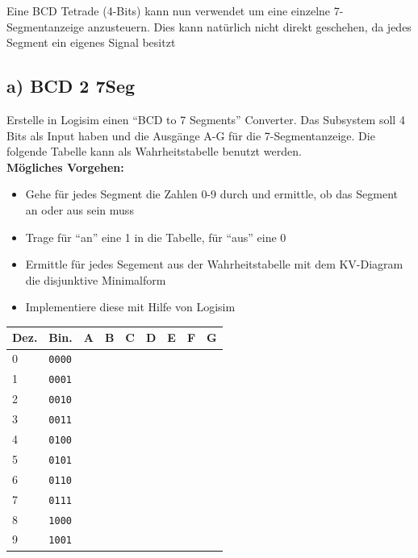 \documentclass[a4paper]{scrartcl}
\begin{document}
Eine BCD Tetrade (4-Bits) kann nun verwendet um eine einzelne 7-Segmentanzeige anzusteuern. Dies kann natürlich nicht direkt geschehen, 
da jedes Segment ein eigenes Signal besitzt

\subsection*{a) BCD 2 7Seg}
Erstelle in Logisim einen ``BCD to 7 Segments'' Converter. Das Subsystem soll 4 Bits als Input haben und die Ausgänge A-G für die 7-Segmentanzeige.
Die folgende Tabelle kann als Wahrheitstabelle benutzt werden.\\


\textbf{Mögliches Vorgehen:}
\begin{itemize}
  \item Gehe für jedes Segment die Zahlen 0-9 durch und ermittle, ob das Segment an oder aus sein muss
  \item Trage für ``an'' eine 1 in die Tabelle, für ``aus'' eine 0
  \item Ermittle für jedes Segement aus der Wahrheitstabelle mit dem KV-Diagram die disjunktive Minimalform
  \item Implementiere diese mit Hilfe von Logisim
\end{itemize}

\begin{table}[h]
  \centering
  \begin{tabular}{l|l|l|l|l|l|l|l|l}
    Dez. & Bin. & A & B & C & D & E & F & G \\ \hline
    0 & \texttt{0000}&&&&&&&\\ 
    1 & \texttt{0001}&&&&&&&\\ 
    2 & \texttt{0010}&&&&&&&\\ 
    3 & \texttt{0011}&&&&&&&\\ 
    4 & \texttt{0100}&&&&&&&\\ 
    5 & \texttt{0101}&&&&&&&\\ 
    6 & \texttt{0110}&&&&&&&\\ 
    7 & \texttt{0111}&&&&&&&\\ 
    8 & \texttt{1000}&&&&&&&\\ 
    9 & \texttt{1001}&&&&&&&\\     
  \end{tabular}
\end{table}
\end{document}
